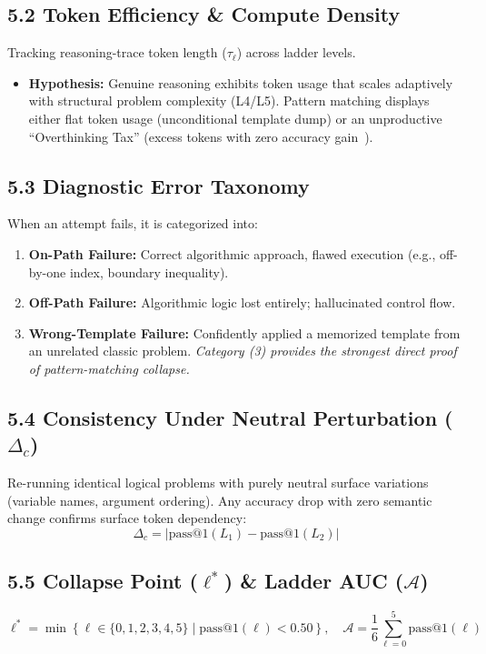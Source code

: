 \documentclass[12pt, a4paper]{article}
\begin{document}
\subsection{5.2 Token Efficiency \& Compute Density}
Tracking reasoning-trace token length ($\tau_\ell$) across ladder levels.
\begin{itemize}[leftmargin=1.5em]
  \item \textbf{Hypothesis:} Genuine reasoning exhibits token usage that scales adaptively with structural problem complexity (L4/L5). Pattern matching displays either flat token usage (unconditional template dump) or an unproductive ``Overthinking Tax'' (excess tokens with zero accuracy gain~\cite{ockbench, thinking_longer}).
\end{itemize}

\subsection{5.3 Diagnostic Error Taxonomy}
When an attempt fails, it is categorized into:
\begin{enumerate}[leftmargin=1.5em]
  \item \textbf{On-Path Failure:} Correct algorithmic approach, flawed execution (e.g., off-by-one index, boundary inequality).
  \item \textbf{Off-Path Failure:} Algorithmic logic lost entirely; hallucinated control flow.
  \item \textbf{Wrong-Template Failure:} Confidently applied a memorized template from an unrelated classic problem. \emph{Category (3) provides the strongest direct proof of pattern-matching collapse.}
\end{enumerate}

\subsection{5.4 Consistency Under Neutral Perturbation ($\Delta_c$)}
Re-running identical logical problems with purely neutral surface variations (variable names, argument ordering). Any accuracy drop with zero semantic change confirms surface token dependency:
\[
\Delta_c = |\text{pass@1}(L_1) - \text{pass@1}(L_2)|
\]

\subsection{5.5 Collapse Point ($\ell^*$) \& Ladder AUC ($\mathcal{A}$)}
\[
\ell^* = \min \left\{ \ell \in \{0,1,2,3,4,5\} \mid \text{pass@1}(\ell) < 0.50 \right\}, \quad \mathcal{A} = \frac{1}{6} \sum_{\ell=0}^{5} \text{pass@1}(\ell)
\]
\end{document}
